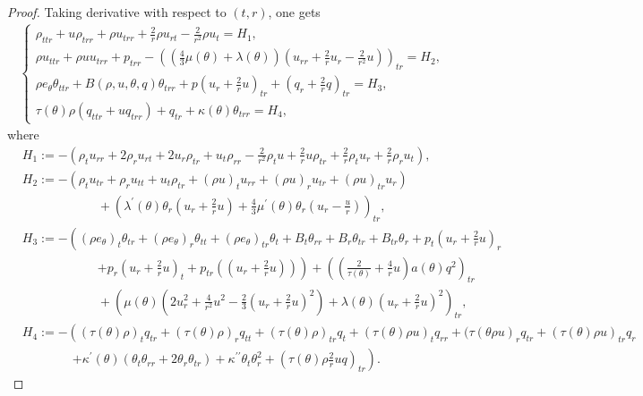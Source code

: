 \documentclass[10pt,a4paper]{amsart}
\begin{document}
 \begin{proof}
 Taking derivative with respect to $(t,r)$, one gets
 \begin{align}\label{1.41}
 \begin{cases}
 \rho_{ttr}+u \rho_{trr} +\rho u_{trr}+\frac{2}{r} \rho u_{rt}-\frac{2}{r^2} \rho u_t=H_1,\\
 \rho u_{ttr} +\rho u u_{trr}+p_{trr}-\left(\left(\frac{4}{3} \mu(\theta)+\lambda(\theta)\right)\left(u_{rr}+\frac{2}{r}u_r-\frac{2}{r^2} u\right)\right)_{tr}=H_2,\\
 \rho e_\theta \theta_{ttr}+ B(\rho, u, \theta, q) \theta_{trr}+p\left(u_r+\frac{2}{r} u\right)_{tr}+\left(q_r+\frac{2}{r} q\right)_{tr}=H_3,\\
 \tau(\theta) \rho (q_{ttr}+ u q_{trr})+q_{tr}+\kappa(\theta) \theta_{trr}=H_4,
 \end{cases}
 \end{align}
 where
 \begin{align*}
 &H_1:=-\left( \rho_t u_{rr}+2 \rho_r u_{rt}+2 u_r \rho_{tr}+u_t \rho_{rr}-\frac{2}{r^2}\rho_t u+\frac{2}{r} u\rho_{tr}+\frac{2}{r} \rho_t u_r+\frac{2}{r} \rho_r u_t\right),\\
& H_2:=-\left( \rho_t u_{tr}+\rho_r u_{tt}+u_t \rho_{tr}+(\rho u)_t u_{rr}+(\rho u)_r u_{tr}+(\rho u)_{tr} u_r\right)\\
&\qquad \qquad \qquad+\left(\lambda^\prime(\theta)\theta_r\left(u_r+\frac{2}{r}u\right)+\frac{4}{3}\mu^\prime(\theta) \theta_r\left(u_r-\frac{u}{r}\right)\right)_{tr},\\
 &H_3:=-\left((\rho e_\theta)_t \theta_{tr}+(\rho e_\theta)_r \theta_{tt}+(\rho e_\theta)_{tr}\theta_t+B_t \theta_{rr}+B_r \theta_{tr}+B_{tr}\theta_r+p_t(u_r+\frac{2}{r}u)_r\right.\\
 &\qquad \qquad \qquad\left.+p_r(u_r+\frac{2}{r} u)_t+p_{tr} \left((u_r+\frac{2}{r} u)\right)\right)+\left(\left(\frac{2}{\tau(\theta)}+\frac{4}{r} u\right) a(\theta) q^2\right)_{tr}\\
&\qquad \qquad \qquad+ \left(\mu(\theta)\left( 2u_r^2+\frac{4}{r^2}u^2-\frac{2}{3} \left(u_r+\frac{2}{r} u\right)^2\right)+\lambda(\theta)\left(u_r+\frac{2}{r} u\right)^2 \right)_{tr},\\
& H_4:=-\left( (\tau(\theta) \rho)_t q_{tr}+(\tau(\theta) \rho)_r q_{tt}+(\tau(\theta) \rho)_{tr} q_t+(\tau(\theta) \rho u)_t q_{rr}+(\tau(\theta \rho u)_r q_{tr}+(\tau(\theta) \rho u)_{tr} q_r \right.\\
& \qquad\qquad\left.+\kappa^\prime(\theta)(\theta_t \theta_{rr}+2\theta_r \theta_{tr})+\kappa^{\prime\prime} \theta_t \theta_r^2+\left( \tau(\theta) \rho \frac{2}{r} u q \right)_{tr}\right).
 \end{align*}


\end{proof}
\end{document}
